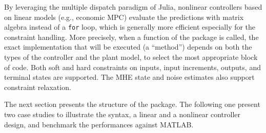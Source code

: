 By leveraging the multiple dispatch paradigm of Julia, nonlinear controllers based on linear models (e.g., economic MPC) evaluate the predictions with matrix algebra instead of a \texttt{for} loop, which is generally more efficient especially for the constraint handling. More precisely, when a function of the package is called, the exact implementation that will be executed (a ``method'') depends on both the types of the controller and the plant model, to select the most appropriate block of code. Both soft and hard constraints on inputs, input increments, outputs, and terminal states are supported. The MHE state and noise estimates also support constraint relaxation.

The next section presents the structure of the package. The following one present two case studies to illustrate the syntax, a linear and a nonlinear controller design, and benchmark the performances against MATLAB.